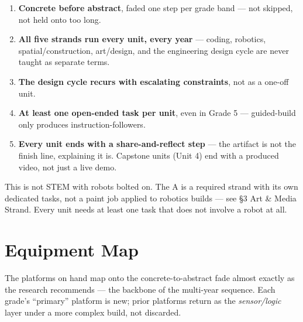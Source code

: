 \documentclass[10pt, a4paper]{article}
\begin{document}
\begin{enumerate}
\item \textbf{Concrete before abstract}, faded one step per grade band --- not skipped, not held onto too long.
\item \textbf{All five strands run every unit, every year} --- coding, robotics, spatial/construction, art/design, and the engineering design cycle are never taught as separate terms.
\item \textbf{The design cycle recurs with escalating constraints}, not as a one-off unit.
\item \textbf{At least one open-ended task per unit}, even in Grade 5 --- guided-build only produces instruction-followers.
\item \textbf{Every unit ends with a share-and-reflect step} --- the artifact is not the finish line, explaining it is. Capstone units (Unit 4) end with a produced video, not just a live demo.
\end{enumerate}

\begin{tcbraster}[raster columns=1, raster equal height=false]
\begin{tcolorbox}[artnote, title={\small\bfseries\color{orng}On the name ``STEAM''}]
This is not STEM with robots bolted on. The A is a required strand with its own dedicated tasks, not a paint job applied to robotics builds --- see \S3 Art \& Media Strand. Every unit needs at least one task that does not involve a robot at all.
\end{tcolorbox}
\end{tcbraster}

\section{Equipment Map}

The platforms on hand map onto the concrete-to-abstract fade almost exactly as the research recommends --- the backbone of the multi-year sequence. Each grade's ``primary'' platform is new; prior platforms return as the \emph{sensor/logic} layer under a more complex build, not discarded.
\end{document}
